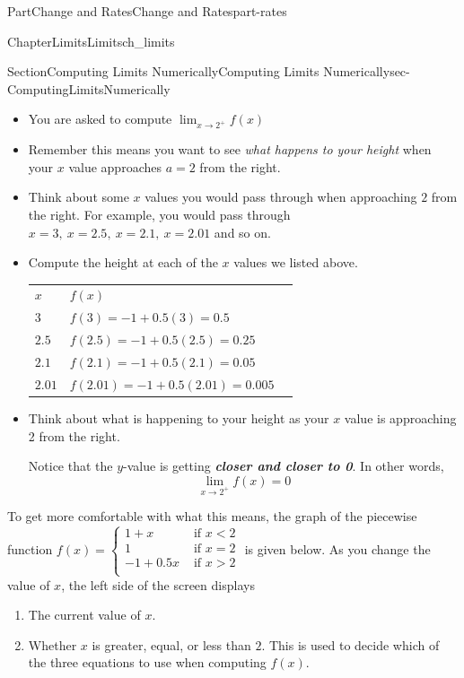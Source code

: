\documentclass[oneside,10pt,]{tufte-book}
\newcommand{\tabularfont}{\relax}
\newcommand{\alert}[1]{\textbf{\textit{#1}}}
\numberwithin{equation}{chapter}
\newcommand{\hrulemedium}{\noalign{\hrule height 0.07em}}
\newcommand{\lt}{<}
\newcommand{\gt}{>}
\begin{document}
\begin{partptx}{Part}{Change and Rates}{}{Change and Rates}{}{}{part-rates}
\begin{chapterptx}{Chapter}{Limits}{}{Limits}{}{}{ch_limits}
\begin{sectionptx}{Section}{Computing Limits Numerically}{}{Computing Limits Numerically}{}{}{sec-ComputingLimitsNumerically}
%
\begin{itemize}[label=\textbullet]
\item{}You are asked to compute \(\displaystyle \lim_{x\rightarrow 2^+} f(x)\)%
\item{}Remember this means you want to see \emph{what happens to your height} when your \(x\) value approaches \(a=2\) from the right.%
\item{}Think about some \(x\) values you would pass through when approaching \(2\) from the right.  For example, you would pass through \(x=3,\ x=2.5,\ x=2.1,\ x=2.01\) and so on.%
\item{}Compute the height at each of the \(x\) values we listed above. \begin{center}%
{\tabularfont%
\begin{tabular}{lBl}
\(x\)&\(f(x)\)\tabularnewline\hrulemedium
\(3\)&\(f(3) = -1 + 0.5(3) = 0.5 \)\tabularnewline\hrulemedium
\(2.5\)&\(f(2.5) = -1 + 0.5(2.5) = 0.25 \)\tabularnewline\hrulemedium
\(2.1\)&\(f(2.1) = -1 + 0.5(2.1) = 0.05 \)\tabularnewline\hrulemedium
\(2.01\)&\(f(2.01) = -1 + 0.5(2.01) = 0.005 \)
\end{tabular}
}%
\end{center}%
%
\item{}Think about what is happening to your height as your \(x\) value is approaching 2 from the right.%
\par
Notice that the \(y\)-value is getting \alert{closer and closer to 0}.  In other words,%
\begin{equation*}
\lim_{x\rightarrow 2^+} f(x) = 0
\end{equation*}
%
\end{itemize}
%
\par
To get more comfortable with what this means, the graph of the piecewise function \(f(x) = 
\begin{cases}
1 + x   & \text{ if } x \lt 2 \\   
1       & \text{ if } x = 2 \\   
-1+0.5x & \text{ if } x \gt 2 \\   
\end{cases}\) is given below. As you change the value of \(x\), the left side of the screen displays%
\begin{enumerate}
\item{}The current value of \(x\).%
\item{}Whether \(x\) is greater, equal, or less than \(2\). This is used to decide which of the three equations to use when computing \(f(x)\).%

\end{enumerate}
\end{sectionptx}
\end{chapterptx}
\end{partptx}
\end{document}
